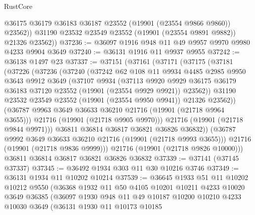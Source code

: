 \begin{lexlean}{RustCore}
\begin{coremodule}
            @36175
            @36179
            @36183
            @36187
            @23552
            (@19901 (@23554 @9866 @9860))
            @23562))
        @31190
        @23532
        @23549
        @23552
        (@19901 (@23554 @9891 @9882))
        @21326
        @23562))
@37236 := @36097 @1916 @948 @11 @49 @9957 @9970 @9980 @4233 @9904 @3649
@37240 := @36131 @1916 @11 @9937 @9955
@37242 := @36138 @1497 @23
@37337 := @37151
    (@37161
      (@37171
        (@37175
          (@37181
            (@37226
              (@37236
                (@37240
                  (@37242
                    @62
                    @108
                    @11
                    @9934
                    @4485
                    @2985
                    @9950
                    @3643
                    @9912
                    @3649
                    (@37107
                      @9934
                      (@37113
                        @9920
                        @9929
                        @36175
                        @36179
                        @36183
                        @37120
                        @23552
                        (@19901 (@23554 @9929 @9921))
                        @23562))
                    @31190
                    @23532
                    @23549
                    @23552
                    (@19901 (@23554 @9950 @9941))
                    @21326
                    @23562))
                (@36787 @9963 @3649 @36633 @36210 @21716 (@19901 (@21718 @9964 @3655)))
                @21716
                (@19901 (@21718 @9905 @9970)))
              @21716
              (@19901 (@21718 @9844 @9971)))
            @36811
            @36814
            @36817
            @36821
            @36826
            @36832))
        (@36787 @9992 @3649 @36633 @36210 @21716 (@19901 (@21718 @9993 @3655)))
        @21716
        (@19901 (@21718 @9836 @9999)))
      @21716
      (@19901 (@21718 @9826 @10000)))
    @36811
    @36814
    @36817
    @36821
    @36826
    @36832
@37339 := @37141 (@37145 @37337)
@37345 := @36492 @1934 @303 @11 @30 @10216 @3746
@37349 := @36131 @1934 @11 @10202 @10214
@37539 := @36645
    @1933
    @51
    @11
    @10202
    @10212
    @9550
    (@36368
      @1932
      @11
      @50
      @4105
      @10201
      @10211
      @4233
      @10020
      @3649
      @36385
      (@36097
        @1930
        @948
        @11
        @49
        @10187
        @10200
        @10210
        @4233
        @10030
        @3649
        (@36131
          @1930
          @11
          @10173
          @10185

\end{coremodule}
\end{lexlean}
